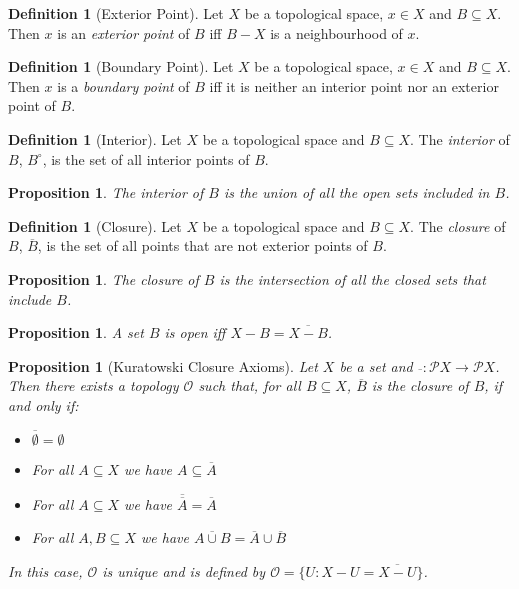 \documentclass{book}
\newtheorem{prop}[ax]{Proposition}
\theoremstyle{definition}
\newtheorem{df}[ax]{Definition}
\begin{document}
\begin{df}[Exterior Point]
Let $X$ be a topological space, $x \in X$ and $B \subseteq X$. Then $x$ is an \emph{exterior point} of $B$ iff $B - X$ is a neighbourhood of $x$.
\end{df}

\begin{df}[Boundary Point]
Let $X$ be a topological space, $x \in X$ and $B \subseteq X$. Then $x$ is a \emph{boundary point} of $B$ iff it is neither an interior point nor an exterior point of $B$.
\end{df}

\begin{df}[Interior]
Let $X$ be a topological space and $B \subseteq X$. The \emph{interior} of $B$, $B^\circ$, is the set of all interior points of $B$.
\end{df}

\begin{prop}
The interior of $B$ is the union of all the open sets included in $B$.
\end{prop}

\begin{df}[Closure]
Let $X$ be a topological space and $B \subseteq X$. The \emph{closure} of $B$, $\overline{B}$, is the set of all points that are not exterior points of $B$.
\end{df}

\begin{prop}
The closure of $B$ is the intersection of all the closed sets that include $B$.
\end{prop}

\begin{prop}
A set $B$ is open iff $X - B = \overline{X - B}$.
\end{prop}

\begin{prop}[Kuratowski Closure Axioms]
Let $X$ be a set and $\overline{\ } : \mathcal{P} X \rightarrow \mathcal{P} X$. Then there exists a topology $\mathcal{O}$ such that, for all $B \subseteq X$, $\overline{B}$ is the closure of $B$, if and only if:
\begin{itemize}
\item $\overline{\emptyset} = \emptyset$
\item For all $A \subseteq X$ we have $A \subseteq \overline{A}$
\item For all $A \subseteq X$ we have $\overline{\overline{A}} = \overline{A}$
\item For all $A, B \subseteq X$ we have $\overline{A \cup B} = \overline{A} \cup \overline{B}$
\end{itemize}
In this case, $\mathcal{O}$ is unique and is defined by $\mathcal{O} = \{ U : X - U = \overline{X - U} \}$.
\end{prop}
\end{document}
